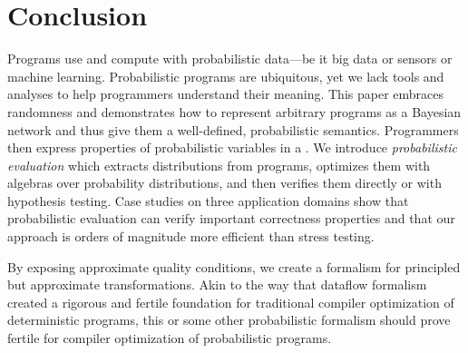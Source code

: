 
\section{Conclusion}
Programs use and compute with probabilistic data---be it big data or
sensors or machine learning.  Probabilistic programs are ubiquitous,
yet we lack tools and analyses to help programmers understand their
meaning. This paper embraces randomness and demonstrates how to
represent arbitrary programs as a Bayesian network and thus give them
a well-defined, probabilistic semantics.  Programmers then express
properties of probabilistic variables in a \passert.  We introduce
\emph{probabilistic evaluation} which extracts distributions from
programs, optimizes them with algebras over probability distributions,
and then verifies them directly or with hypothesis testing.  Case
studies on three application domains show that probabilistic evaluation
can verify important correctness properties
and that our approach is orders of
magnitude more efficient than stress testing.


By exposing approximate quality conditions, we create a
formalism for principled but approximate transformations.  Akin to the
way that dataflow formalism created a rigorous and fertile foundation
for traditional compiler optimization of deterministic programs, this
or some other probabilistic formalism should prove fertile for compiler optimization
of probabilistic programs.
